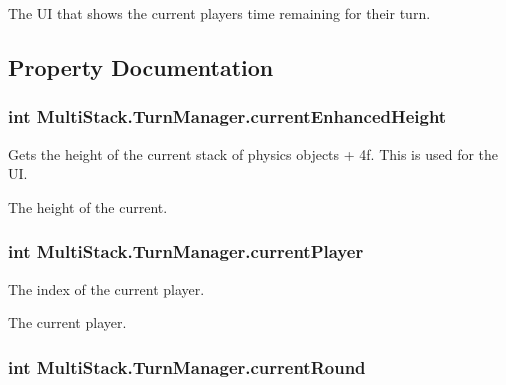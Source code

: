 The U\+I that shows the current players time remaining for their turn. 



\subsection{Property Documentation}
\hypertarget{class_multi_stack_1_1_turn_manager_a02c135523dbabc3d7eef1467e567ec7c}{}
\subsubsection[{current\+Enhanced\+Height}]{\setlength{\rightskip}{0pt plus 5cm}int Multi\+Stack.\+Turn\+Manager.\+current\+Enhanced\+Height\hspace{0.3cm}{\ttfamily [get]}}\label{class_multi_stack_1_1_turn_manager_a02c135523dbabc3d7eef1467e567ec7c}


Gets the height of the current stack of physics objects + 4f. This is used for the U\+I. 

The height of the current.\hypertarget{class_multi_stack_1_1_turn_manager_a308c362d6c9ad9c8ca5f2e039ca76f90}{}
\subsubsection[{current\+Player}]{\setlength{\rightskip}{0pt plus 5cm}int Multi\+Stack.\+Turn\+Manager.\+current\+Player\hspace{0.3cm}{\ttfamily [get]}}\label{class_multi_stack_1_1_turn_manager_a308c362d6c9ad9c8ca5f2e039ca76f90}


The index of the current player. 

The current player.\hypertarget{class_multi_stack_1_1_turn_manager_a74740c372c337673c08f6fe42cd35f5a}{}
\subsubsection[{current\+Round}]{\setlength{\rightskip}{0pt plus 5cm}int Multi\+Stack.\+Turn\+Manager.\+current\+Round\hspace{0.3cm}{\ttfamily [get]}}\label{class_multi_stack_1_1_turn_manager_a74740c372c337673c08f6fe42cd35f5a}


